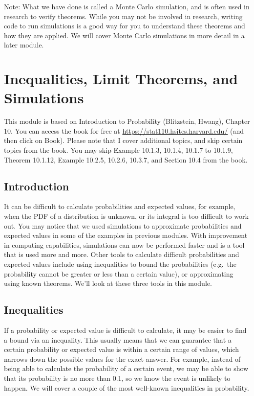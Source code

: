 \documentclass[
]{book}
\begin{document}
Note: What we have done is called a Monte Carlo simulation, and is often used in research to verify theorems. While you may not be involved in research, writing code to run simulations is a good way for you to understand these theorems and how they are applied. We will cover Monte Carlo simulations in more detail in a later module.

\chapter{Inequalities, Limit Theorems, and Simulations}\label{inequalities-limit-theorems-and-simulations}

This module is based on Introduction to Probability (Blitzstein, Hwang), Chapter 10. You can access the book for free at \url{https://stat110.hsites.harvard.edu/} (and then click on Book). Please note that I cover additional topics, and skip certain topics from the book. You may skip Example 10.1.3, 10.1.4, 10.1.7 to 10.1.9, Theorem 10.1.12, Example 10.2.5, 10.2.6, 10.3.7, and Section 10.4 from the book.

\section{Introduction}\label{introduction-2}

It can be difficult to calculate probabilities and expected values, for example, when the PDF of a distribution is unknown, or its integral is too difficult to work out. You may notice that we used simulations to approximate probabilities and expected values in some of the examples in previous modules. With improvement in computing capabilities, simulations can now be performed faster and is a tool that is used more and more. Other tools to calculate difficult probabilities and expected values include using inequalities to bound the probabilities (e.g.~the probability cannot be greater or less than a certain value), or approximating using known theorems. We'll look at these three tools in this module.

\section{Inequalities}\label{inequalities}

If a probability or expected value is difficult to calculate, it may be easier to find a bound via an inequality. This usually means that we can guarantee that a certain probability or expected value is within a certain range of values, which narrows down the possible values for the exact answer. For example, instead of being able to calculate the probability of a certain event, we may be able to show that its probability is no more than 0.1, so we know the event is unlikely to happen. We will cover a couple of the most well-known inequalities in probability.
\end{document}
